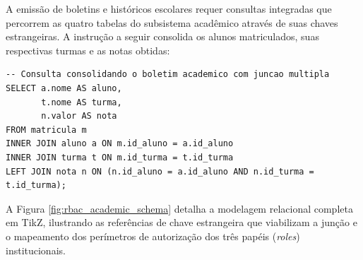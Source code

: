 A emissão de boletins e históricos escolares requer consultas integradas que percorrem as quatro tabelas do subsistema acadêmico através de suas chaves estrangeiras. A instrução a seguir consolida os alunos matriculados, suas respectivas turmas e as notas obtidas:

\begin{lstlisting}
-- Consulta consolidando o boletim academico com juncao multipla
SELECT a.nome AS aluno,
       t.nome AS turma,
       n.valor AS nota
FROM matricula m
INNER JOIN aluno a ON m.id_aluno = a.id_aluno
INNER JOIN turma t ON m.id_turma = t.id_turma
LEFT JOIN nota n ON (n.id_aluno = a.id_aluno AND n.id_turma = t.id_turma);
\end{lstlisting}

A Figura \ref{fig:rbac_academic_schema} detalha a modelagem relacional completa em TikZ, ilustrando as referências de chave estrangeira que viabilizam a junção e o mapeamento dos perímetros de autorização dos três papéis (\textit{roles}) institucionais.

